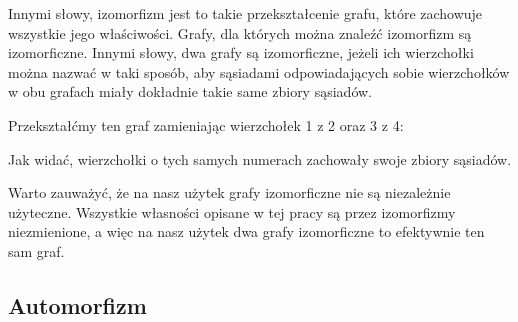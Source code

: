 \documentclass[11pt]{article}
\begin{document}
  Innymi słowy, izomorfizm jest to takie przekształcenie grafu, które zachowuje wszystkie jego właściwości. Grafy, dla których można znaleźć izomorfizm są izomorficzne. Innymi słowy, dwa grafy są izomorficzne, jeżeli ich wierzchołki można nazwać w taki sposób, 
  aby sąsiadami odpowiadających sobie wierzchołków w obu grafach miały dokładnie takie same zbiory sąsiadów.
  \begin{figure}[h]
    \centering
    \caption{}
  \end{figure}

  Przekształćmy ten graf zamieniając wierzchołek 1 z 2 oraz 3 z 4:
  \begin{figure}[h]
    \centering
    \caption{}
  \end{figure}

  Jak widać, wierzchołki o tych samych numerach zachowały swoje zbiory sąsiadów. 

  Warto zauważyć, że na nasz użytek grafy izomorficzne nie są niezależnie użyteczne. Wszystkie własności opisane w tej pracy są przez izomorfizmy niezmienione, a więc na nasz użytek dwa grafy izomorficzne to efektywnie ten sam graf.


  \subsection{Automorfizm}
\end{document}
